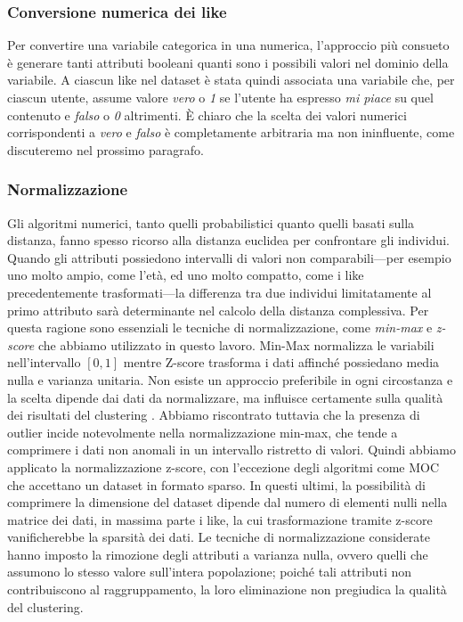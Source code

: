 \subsubsection{Conversione numerica dei like}
\label{subsubsec:conversione_like}
Per convertire una variabile categorica in una numerica, l'approccio pi\`u consueto \`e generare tanti attributi booleani quanti sono i possibili valori nel dominio della variabile. A ciascun like nel dataset \`e stata quindi associata una variabile che, per ciascun utente, assume valore \textit{vero} o \textit{1} se l'utente ha espresso \textit{mi piace} su quel contenuto e \textit{falso} o \textit{0} altrimenti. \`E chiaro che la scelta dei valori numerici corrispondenti a \textit{vero} e \textit{falso} \`e completamente arbitraria ma non ininfluente, come discuteremo nel prossimo paragrafo.
\subsubsection{Normalizzazione}
\label{subsubsec:normalizzazione}
Gli algoritmi numerici, tanto quelli probabilistici quanto quelli basati sulla distanza, fanno spesso ricorso alla distanza euclidea per confrontare gli individui. Quando gli attributi possiedono intervalli di valori non comparabili---per esempio uno molto ampio, come l'et\`a, ed uno molto compatto, come i like precedentemente trasformati---la differenza tra due individui limitatamente al primo attributo sar\`a determinante nel calcolo della distanza complessiva. Per questa ragione sono essenziali le tecniche di normalizzazione, come \mbox{\textit{min-max}} e \mbox{\textit{z-score}} che abbiamo utilizzato in questo lavoro. Min-Max normalizza le variabili nell'intervallo $[0,1]$ mentre Z-score trasforma i dati affinch\'e possiedano media nulla e varianza unitaria. Non esiste un approccio preferibile in ogni circostanza e la scelta dipende dai dati da normalizzare, ma influisce certamente sulla qualit\`a dei risultati del clustering \cite{visalakshi2009}. Abbiamo riscontrato tuttavia che la presenza di outlier incide notevolmente nella normalizzazione min-max, che tende a comprimere i dati non anomali in un intervallo ristretto di valori. Quindi abbiamo applicato la normalizzazione z-score, con l'eccezione degli algoritmi come MOC che accettano un dataset in formato sparso. In questi ultimi, la possibilit\`a di comprimere la dimensione del dataset dipende dal numero di elementi nulli nella matrice dei dati, in massima parte i like, la cui trasformazione tramite z-score vanificherebbe la sparsit\`a dei dati. Le tecniche di normalizzazione considerate hanno imposto la rimozione degli attributi a varianza nulla, ovvero quelli che assumono lo stesso valore sull'intera popolazione; poich\'e tali attributi non contribuiscono al raggruppamento, la loro eliminazione non pregiudica la qualit\`a del clustering.
